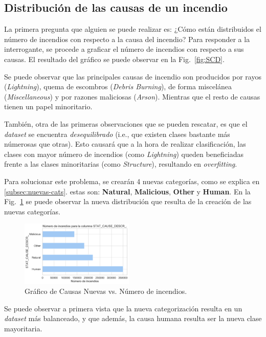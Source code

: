 \subsection{Distribución de las causas de un incendio}
La primera pregunta que alguien se puede realizar es: ¿Cómo están distribuidos el número de incendios con respecto a la causa del incendio? Para responder a la interrogante, se procede a graficar el número de incendios con respecto a sus causas. El resultado del gráfico se puede observar en la Fig.~\ref{fig:SCD}.

Se puede observar que las principales causas de incendio son producidos por rayos (\textit{Lightning}), quema de escombros (\textit{Debris Burning}), de forma miscelánea (\textit{Miscellaneous}) y por razones maliciosas (\textit{Arson}). Mientras que el resto de causas tienen un papel minoritario. 

También, otra de las primeras observaciones que se pueden rescatar, es que el \textit{dataset} se encuentra \textit{desequilibrado} (i.e., que existen clases bastante más númerosas que otras). Esto causará que a la hora de realizar clasificación, las clases con mayor número de incendios (como \textit{Lightning}) queden beneficiadas frente a las clases minoritarias (como \textit{Structure}), resultando en \textit{overfitting}.

Para solucionar este problema, se crearán 4 nuevas categorías, como se explica en \ref{subsec:nuevas-cats}. estas son: \textbf{Natural}, \textbf{Malicious}, \textbf{Other} y \textbf{Human}. En la Fig.~\ref{fig:SCDN} se puede observar la nueva distribución que resulta de la creación de las nuevas categorías.
\begin{figure}
    \centering
    \includegraphics[width=0.48\textwidth]{imagenes/barh_STAT_CAUSE_DESCR_.pdf}
    \caption{Gráfico de Causas Nuevas vs. Número de incendios.}
    \label{fig:SCDN}
\end{figure}

Se puede observar a primera vista que la nueva categorización resulta en un \textit{dataset} más balanceado, y que además, la causa humana resulta ser la nueva clase mayoritaria.

